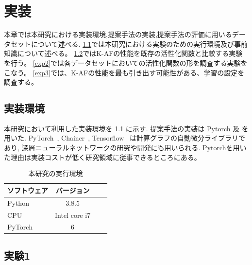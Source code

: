 \chapter{実装}
\label{implementation}

本章では本研究における実装環境,提案手法の実装,提案手法の評価に用いるデータセットについて述べる.
\ref{impl_env}では本研究における実験のための実行環境及び事前知識について述べる。
\ref{exp1}ではK-AFの性能を既存の活性化関数と比較する実験を行う。
\ref{exp2}では各データセットにおいての活性化関数の形を調査する実験をこなう。
\ref{exp3}では、K-AFの性能を最も引き出す可能性がある、学習の設定を調査する。



\section{実装環境}
\label{impl_env}



本研究において利用した実装環境を \ref{impl_table} に示す. 提案手法の実装は Pytorch 及
を用いた.  PyTorch~\cite{pytorch}, Chainer~\cite{chainer},  Tensorflow~\cite{tensorflow} は計算グラフの自動微分ライブラリであり, 深層ニューラルネットワークの研究や開発にも用いられる.
Pytorchを用いた理由は実装コストが低く研究領域に従事できるところにある。


\begin{table}[htbp]
\label{impl_table}
    \begin{center}
        \caption{本研究の実行環境}
        \vspace{5mm} 
        \begin{tabular}{l*{2}{c}r}
        ソフトウェア              & バージョン \\
        \hline
        Python            & 3.8.5  \\
        CPU               & Intel core i7  \\
        PyTorch           & 6 \\
        \end{tabular}
    \end{center}
\end{table}



\vspace{-15mm} 
\section{実験1}
\label{exp1}

